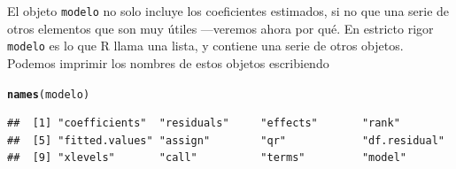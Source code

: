 \documentclass[12pt]{report}\usepackage[]{graphicx}\usepackage[]{color}
\makeatletter
\newcommand{\hlstd}[1]{\textcolor[rgb]{0.345,0.345,0.345}{#1}}%
\newcommand{\hlkwd}[1]{\textcolor[rgb]{0.737,0.353,0.396}{\textbf{#1}}}%
\newenvironment{kframe}{%
 \def\at@end@of@kframe{}%
 \ifinner\ifhmode%
  \def\at@end@of@kframe{\end{minipage}}%
  \begin{minipage}{\columnwidth}%
 \fi\fi%
 \def\FrameCommand##1{\hskip\@totalleftmargin \hskip-\fboxsep
 \colorbox{shadecolor}{##1}\hskip-\fboxsep
     \hskip-\linewidth \hskip-\@totalleftmargin \hskip\columnwidth}%
 \MakeFramed {\advance\hsize-\width
   \@totalleftmargin\z@ \linewidth\hsize
   \@setminipage}}%
 {\par\unskip\endMakeFramed%
 \at@end@of@kframe}
\newenvironment{knitrout}{}{} %
\makeatother
\begin{document}
El objeto \verb|modelo| no solo incluye los coeficientes estimados, si no que una serie de otros elementos que son muy útiles ---veremos ahora por qué. En estricto rigor \verb|modelo| es lo que R llama una lista, y contiene una serie de otros objetos. Podemos imprimir los nombres de estos objetos escribiendo
\begin{knitrout}
\color{fgcolor}\begin{kframe}
\begin{alltt}
\hlkwd{names}\hlstd{(modelo)}
\end{alltt}
\begin{verbatim}
##  [1] "coefficients"  "residuals"     "effects"       "rank"         
##  [5] "fitted.values" "assign"        "qr"            "df.residual"  
##  [9] "xlevels"       "call"          "terms"         "model"
\end{verbatim}
\end{kframe}
\end{knitrout}
\end{document}
